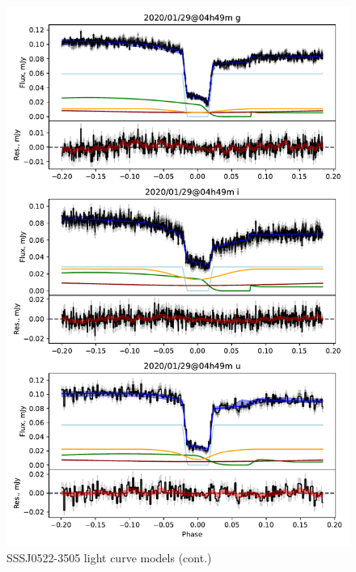 \begin{figure}
    \centering
    \includegraphics[width=\textwidth]{figures/results/three_cvs_with_weird_colours/SSS111126/SSS111126_3.pdf}
    \caption{SSSJ0522-3505 light curve models (cont.)}
    \label{fig:SSSJ0522-3505 all light curves cont 2}
\end{figure}
\clearpage


